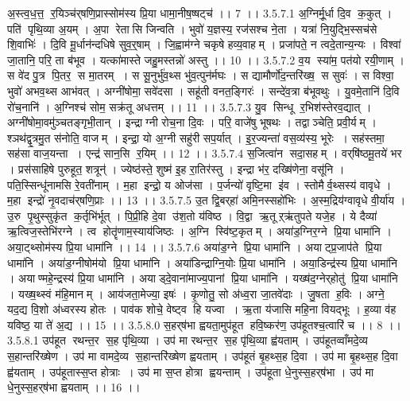 अ॒स्त्व॒ध॒त्त॒॒ र॒यिञ्च॑र्‌षणि॒प्रास्सोम॑स्य प्रि॒या धामा॒नीष॒ष्षट्च॑ ।। 7 ।।
3.5.7.1
अ॒ग्निर्मू॒र्धा दि॒व क॒कुत् । पति॑ पृथि॒व्या अ॒यम् । अ॒पा रेता॑सि जिन्वति । भुवो॑ य॒ज्ञस्य॒ रज॑सश्च ने॒ता । यत्रा॑ नि॒युद्भि॒स्सच॑से शि॒वाभिः॑ । दि॒वि मू॒र्धान॑न्दधिषे सुव॒र्॒षाम् । जि॒ह्वाम॑ग्ने चकृषे हव्य॒वाहम् । प्रजा॑पते॒ न त्वदे॒तान्य॒न्यः । विश्वा॑ जा॒तानि॒ परि॒ ता ब॑भूव । यत्का॑मास्ते जहु॒मस्तन्नो॑ अस्तु ।। 10 ।।
3.5.7.2
व॒य स्या॑म॒ पत॑यो रयी॒णाम् । स वे॑द पु॒त्र पि॒तर॒॒ स मा॒तरम् । स सू॒नुर्भु॑व॒थ्स भु॑व॒त्पुन॑र्मघः । स द्यामौर्णो॑द॒न्तरि॑ख्ष॒॒ स सुवः॑ । स विश्वा॒ भुवो॑ अभव॒थ्स आभ॑वत् । अग्नी॑षोमा॒ सवे॑दसा । सहू॑ती वनत॒ङ्गिरः॑ । सन्दे॑व॒त्रा ब॑भूवथुः । यु॒वमे॒तानि॑ दि॒वि रो॑च॒नानि॑ । अ॒ग्निश्च॑ सोम॒ सक्र॑तू अधत्तम् ।। 11 ।।
3.5.7.3
यु॒व सिन्धू॑ र॒भिश॑स्तेरव॒द्यात् । अग्नी॑षोमा॒वमु॑ञ्चतङ्गृभी॒तान् । इन्द्राग्नी रोच॒ना दि॒वः । परि॒ वाजे॑षु भूषथः । तद्वाञ्चेति॒ प्रवी॒र्यम् । श्ञथ॑द्वृ॒त्रमु॒त स॑नोति॒ वाजम् । इन्द्रा॒ यो अ॒ग्नी सहु॑री सप॒र्यात् । इ॒र॒ज्यन्ता॑ वस॒व्य॑स्य॒ भूरेः । सह॑स्तमा॒ सह॑सा वाज॒यन्ता । एन्द्र॑ सान॒सि र॒यिम् ।। 12 ।।
3.5.7.4
स॒जित्वा॑न सदा॒सहम् । वर्‌षि॑ष्ठमू॒तये॑ भर । प्रस॑साहिषे पुरुहूत॒ शत्रून्॑ । ज्येष्ठ॑स्ते॒ शुष्म॑ इ॒ह रा॒तिर॑स्तु । इन्द्रा भ॑र॒ दख्षि॑णेना॒ वसू॑नि । पति॒स्सिन्धू॑नामसि रे॒वती॑नाम् । म॒हा इन्द्रो॒ य ओज॑सा । प॒र्जन्यो॑ वृष्टि॒मा इ॑व । स्तोमैर्व॒थ्सस्य॑ वावृधे । म॒हा इन्द्रो॑ नृ॒वदाच॑र्‌षणि॒प्राः ।। 13 ।।
3.5.7.5
उ॒त द्वि॒बर्‌हा॑ अमि॒नस्सहो॑भिः । अ॒स्म॒द्रिय॑ग्वावृधे वी॒र्या॑य । उ॒रु पृ॒थुस्सुकृ॑त क॒र्तृभि॑र्भूत् । पि॒प्री॒हि दे॒वा उ॑श॒तो य॑विष्ठ । वि॒द्वा ऋ॒तूऱ्ऋ॑तुपते यजे॒ह । ये दैव्या॑ ऋ॒त्विज॒स्तेभि॑रग्ने । त्व होतॄ॑णाम॒स्याय॑जिष्ठः । अ॒ग्नि स्वि॑ष्ट॒कृतम् । अया॑ड॒ग्निर॒ग्ने प्रि॒या धामा॑नि । अया॒ट्थ्सोम॑स्य प्रि॒या धामा॑नि ।। 14 ।।
3.5.7.6
अया॑ड॒ग्ने प्रि॒या धामा॑नि । अयाट्प्र॒जाप॑ते प्रि॒या धामा॑नि । अया॑ड॒ग्नीषोम॑यो प्रि॒या धामा॑नि । अया॑डिन्द्राग्नि॒योः प्रि॒या धामा॑नि । अया॒डिन्द्र॑स्य प्रि॒या धामा॑नि । अयाण्महे॒न्द्रस्य॑ प्रि॒या धामा॑नि । अयाड्दे॒वाना॑माज्य॒पानां प्रि॒या धामा॑नि । यख्ष॑द॒ग्नेर्‌होतु॑ प्रि॒या धामा॑नि । यख्ष॒थ्स्वं म॑हि॒मानम् । आय॑जता॒मेज्या॒ इषः॑ । कृ॒णोतु॒ सो अ॑ध्व॒रा जा॒तवे॑दाः । जु॒षता॑ ह॒विः । अग्ने॒ यद॒द्य वि॒शो अ॑ध्वरस्य होतः । पाव॑क शोचे॒ वेष्ट्व हि यज्वा । ऋ॒ता य॑जासि महि॒ना वियद्भूः । ह॒व्या व॑ह यविष्ठ॒ या ते॑ अ॒द्य ।। 15 ।।
3.5.8.0
स॒हर्‌ष॑भा ह्वयता॒मुप॑हूत हवि॒ष्कर॑ण॒ उप॑हूतश्च॒त्वारि॑ च ।। 8 ।।
3.5.8.1
उप॑हूत रथन्त॒र स॒ह पृ॑थि॒व्या । उप॑ मा रथन्त॒र स॒ह पृ॑थि॒व्या ह्व॑यताम् । उप॑हूतव्वाँमदे॒व्य स॒हान्तरि॑ख्षेण । उप॑ मा वामदे॒व्य स॒हान्तरि॑ख्षेण ह्वयताम् । उप॑हूतं बृ॒हथ्स॒ह दि॒वा । उप॑ मा बृ॒हथ्स॒ह दि॒वा ह्व॑यताम् । उप॑हूतास्स॒प्त होत्राः । उप॑ मा स॒प्त होत्रा ह्वयन्ताम् । उप॑हूता धे॒नुस्स॒हर्‌ष॑भा । उप॑ मा धे॒नुस्स॒हर्‌ष॑भा ह्वयताम् ।। 16 ।।
